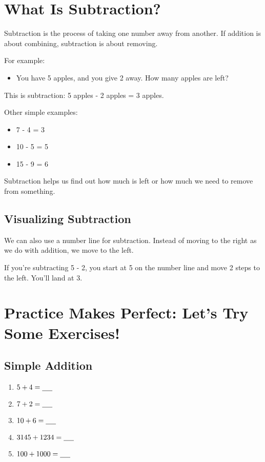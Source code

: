 \section{What Is Subtraction?}
Subtraction is the process of taking one number away from another. If addition is about combining, subtraction is about removing.

For example:
\begin{itemize}
    \item You have 5 apples, and you give 2 away. How many apples are left?
\end{itemize}
This is subtraction: 5 apples - 2 apples = 3 apples.

Other simple examples:
\begin{itemize}
    \item 7 - 4 = 3
    \item 10 - 5 = 5
    \item 15 - 9 = 6
\end{itemize}

Subtraction helps us find out how much is left or how much we need to remove from something.

\subsection{Visualizing Subtraction}
We can also use a number line for subtraction. Instead of moving to the right as we do with addition, we move to the left.

If you’re subtracting 5 - 2, you start at 5 on the number line and move 2 steps to the left. You’ll land at 3.

\section{Practice Makes Perfect: Let’s Try Some Exercises!}
\subsection{Simple Addition}
\begin{enumerate}[label=\alph*)]
    \item $5 + 4 = \underline{\hspace{0.5cm}}$
    \item $7 + 2 = \underline{\hspace{0.5cm}}$
    \item $10 + 6 = \underline{\hspace{0.5cm}}$
    \item $3145 + 1234 = \underline{\hspace{0.5cm}}$
    \item $100 + 1000 = \underline{\hspace{0.5cm}}$
\end{enumerate}

